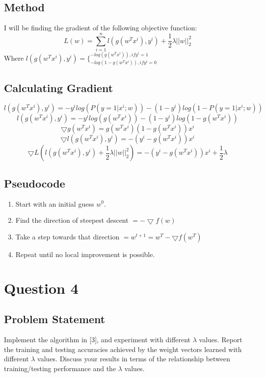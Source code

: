 \documentclass[letterpaper,10pt]{article}
\begin{document}
\subsection{Method}
I will be finding the gradient of the following objective function:
\[L(w) = \sum_{i=1}^n l(g(w^T x^i), y^i) + \frac{1}{2} \lambda ||w||_2^2  \]
Where \(l(g(w^T x^i), y^i) = \{^{-log(g(w^T x^i)), if y^i = 1}_{-log(1-g(w^T x^i)), if y^i = 0} \)

\subsection{Calculating Gradient}
\[ l(g(w^T x^i), y^i) = -y^i log(P(y=1 | x^i; w)) - (1-y^i) log(1-P(y=1 | x^i; w)) \]
\[ l(g(w^T x^i), y^i) = -y^i log(g(w^T x^i)) - (1-y^i) log(1 - g(w^T x^i)) \]
\[ \bigtriangledown g(w^T x^i) = g(w^T x^i) (1 - g(w^T x^i)) x^i \]
\[ \bigtriangledown l(g(w^T x^i), y^i) = -(y^i - g(w^T x^i)) x^i \]
\[ \bigtriangledown L(l(g(w^T x^i), y^i) + \frac{1}{2} \lambda ||w||_2^2) = -(y^i - g(w^T x^i)) x^i + \frac{1}{2} \lambda \]

\subsection{Pseudocode}
\begin{enumerate}
	\item{Start with an initial guess \(w^0\).}
	\item{Find the direction of steepest descent \(= - \bigtriangledown f(w) \)}
	\item{Take a step towards that direction \( = w^{t+1} = w^T - \bigtriangledown f(w^T) \)}
	\item{Repeat until no local improvement is possible.}
\end{enumerate}

\section{Question 4}
\subsection{Problem Statement}
Implement the algorithm in [3], and experiment with different \(\lambda\) values. Report the training and testing accuracies achieved by the weight vectors learned with different \(\lambda\) values. Discuss your results in terms of the relationship between training/testing performance and the \(\lambda\) values.
\end{document}
